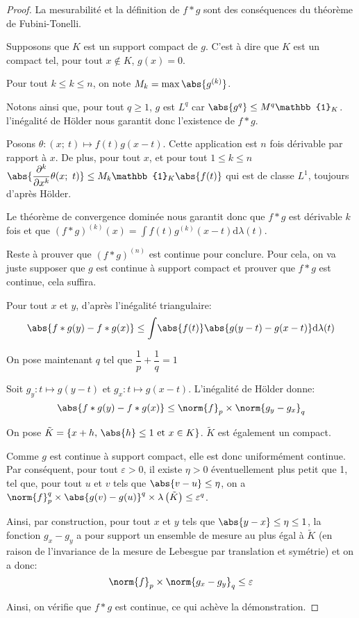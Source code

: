 \begin{proof}
La mesurabilité et la définition de $f*g$ sont des conséquences du théorème de Fubini-Tonelli.

Supposons que $K$ est un support compact de $g$. C'est à dire que $K$ est un compact tel, pour tout $x \notin K$, $g(x)=0$.

Pour tout $k \leq k \leq n$, on note $M_k = \max \abs{g^{(k)}}$.

Notons ainsi que, pour tout $q \geq 1$, $g$ est $L^q$ car $\abs{g^q} \leq M^q \mathbb{1}_K$. l'inégalité de Hölder nous garantit donc l'existence de $f*g$.

Posons $\theta: (x;~t) \mapsto f(t)g(x-t)$. Cette application est $n$ fois dérivable par rapport à $x$. De plus, pour tout $x$, et pour tout $1 \leq k \leq n$
$\abs{\dfrac{\partial^k}{\partial x^k} \theta(x;~t)} \leq M_k \mathbb{1}_K \abs{f(t)}$ qui est de classe $L^1$, toujours d'après Hölder.

Le théorème de convergence dominée nous garantit donc que $f*g$ est dérivable $k$ fois et que $(f*g)^{(k)}(x) = \displaystyle{\int} f(t)g^{(k)}(x-t) \mathrm d \lambda(t)$.

Reste à prouver que $(f*g)^{(n)}$ est continue pour conclure. Pour cela, on va juste supposer que $g$ est continue à support compact et prouver que $f*g$ est continue, cela suffira.

Pour tout $x$ et $y$, d'après l'inégalité triangulaire:
\[
\abs{f*g(y)-f*g(x)} \leq \displaystyle{\int} \abs{f(t)} \abs{g(y-t)-g(x-t)} \mathrm d \lambda(t)
\]

On pose maintenant $q$ tel que $\dfrac{1}{p} + \dfrac{1}{q} = 1$

Soit $g_y: t \mapsto g(y-t)$ et $g_x: t \mapsto g(x-t)$. L'inégalité de Hölder donne:
\[
\abs{f*g(y)-f*g(x)} \leq \norm{f}_p \times \norm{g_y-g_x}_q
\]

On pose $\tilde{K} = \left\{x+h, \, \abs{h} \leq 1 \text{ et }x \in K\right\}$. $\tilde{K}$ est également un compact.

Comme $g$ est continue à support compact, elle est donc uniformément continue. Par conséquent, pour tout $\varepsilon > 0$, il existe $\eta>0$ éventuellement plus petit que 1, tel que, pour tout $u$ et $v$ tels que $\abs{v-u} \leq \eta$, on a $\norm{f}_p^q \times \abs{g(v)-g(u)}^q \times \lambda\left(\tilde{K}\right) \leq \varepsilon^q$. 

Ainsi, par construction, pour tout $x$ et $y$ tels que $\abs{y-x} \leq \eta \leq 1$, la fonction $g_x-g_y$ a pour support un ensemble de mesure au plus égal à $\tilde{K}$ (en raison de l'invariance de la mesure de Lebesgue par translation et symétrie) et on a donc:
\[
\norm{f}_p \times \norm{g_x-g_y}_q \leq \varepsilon
\]

Ainsi, on vérifie que $f*g$ est continue, ce qui achève la démonstration.
\end{proof}

